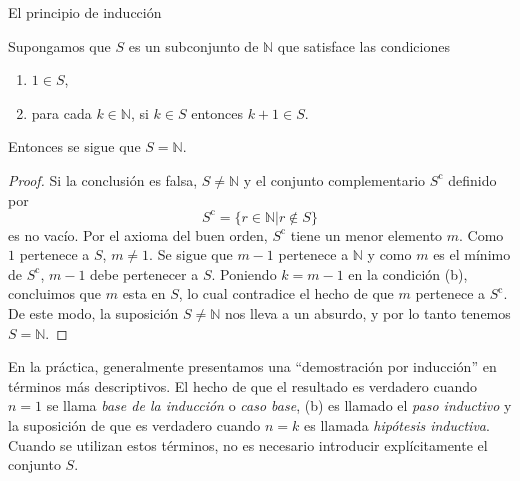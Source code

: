 \begin{section}{El principio de inducción}
\begin{teorema}\label{t1.4} Supongamos que $S$ es un subconjunto de $\mathbb N$ que satisface las condiciones 
\begin{enumerate}
\item $1 \in S$,
\item para cada $k \in \mathbb N$, si $ k \in S$ entonces $k+1\in S$.
\end{enumerate}
Entonces se sigue que $S=\mathbb N$.
\end{teorema}
\begin{proof}Si la conclusión es falsa, $S \not= \mathbb N$ y
el conjunto complementario $S^{\text{c}}$ definido por
$$
S^{\text{c}}= \{ r \in \mathbb N | r\not\in S\}
$$
 es no vacío. Por el axioma del buen orden, $S^{\text{c}}$ tiene un menor
elemento $m$. Como $1$ pertenece a $S$, $m\not=1$. Se sigue que
$m-1$ pertenece a $\mathbb N$ y como $m$ es el mínimo de
$S^{\text{c}}$, $m-1$ debe pertenecer a $S$. Poniendo $k=m-1$ en
la condición (b), concluimos que $m$ esta en $S$, lo cual
contradice el hecho de que $m$ pertenece a $S^{\text{c}}$. De este
modo, la suposición $S \not= \mathbb N$ nos lleva a un absurdo, y
por lo tanto tenemos $S= \mathbb N$.
\end{proof}

En la práctica, generalmente presentamos una ``demostración por
inducción'' en términos más descriptivos. El hecho de que el
resultado es verdadero cuando $n=1$ se llama {\it base de la
inducción} o {\it caso base}, (b) es llamado  el {\em paso inductivo} y la suposición de que es verdadero cuando $n=k$ es
llamada {\it hipótesis inductiva}. Cuando se utilizan estos
términos, no es necesario introducir explícitamente el conjunto
$S$.



\end{section}
